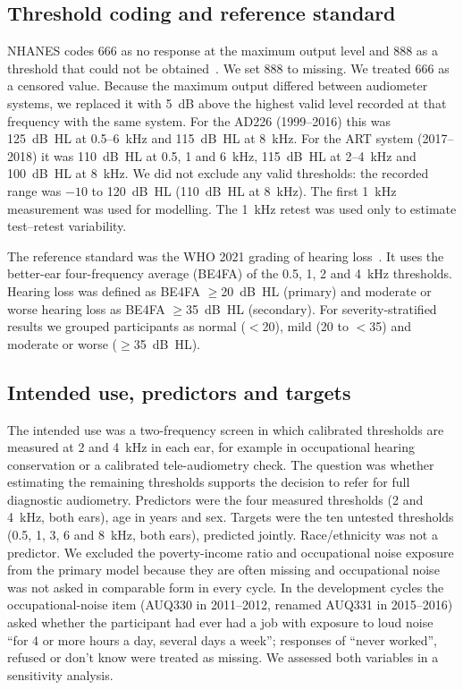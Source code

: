 \documentclass[11pt]{article}
\begin{document}
\subsection*{Threshold coding and reference standard}
NHANES codes 666 as no response at the maximum output level and 888 as a threshold that could not be obtained~\cite{nhanes_aux_g}. We set 888 to missing. We treated 666 as a censored value. Because the maximum output differed between audiometer systems, we replaced it with 5~dB above the highest valid level recorded at that frequency with the same system. For the AD226 (1999--2016) this was 125~dB~HL at 0.5--6~kHz and 115~dB~HL at 8~kHz. For the ART system (2017--2018) it was 110~dB~HL at 0.5, 1 and 6~kHz, 115~dB~HL at 2--4~kHz and 100~dB~HL at 8~kHz. We did not exclude any valid thresholds: the recorded range was $-10$ to 120~dB~HL (110~dB~HL at 8~kHz). The first 1~kHz measurement was used for modelling. The 1~kHz retest was used only to estimate test--retest variability.

The reference standard was the WHO 2021 grading of hearing loss~\cite{who2021,humes2019}. It uses the better-ear four-frequency average (BE4FA) of the 0.5, 1, 2 and 4~kHz thresholds. Hearing loss was defined as BE4FA $\geq$20~dB~HL (primary) and moderate or worse hearing loss as BE4FA $\geq$35~dB~HL (secondary). For severity-stratified results we grouped participants as normal ($<$20), mild (20 to $<$35) and moderate or worse ($\geq$35~dB~HL).

\subsection*{Intended use, predictors and targets}
The intended use was a two-frequency screen in which calibrated thresholds are measured at 2 and 4~kHz in each ear, for example in occupational hearing conservation or a calibrated tele-audiometry check. The question was whether estimating the remaining thresholds supports the decision to refer for full diagnostic audiometry. Predictors were the four measured thresholds (2 and 4~kHz, both ears), age in years and sex. Targets were the ten untested thresholds (0.5, 1, 3, 6 and 8~kHz, both ears), predicted jointly. Race/ethnicity was not a predictor. We excluded the poverty-income ratio and occupational noise exposure from the primary model because they are often missing and occupational noise was not asked in comparable form in every cycle. In the development cycles the occupational-noise item (AUQ330 in 2011--2012, renamed AUQ331 in 2015--2016) asked whether the participant had ever had a job with exposure to loud noise ``for 4 or more hours a day, several days a week''; responses of ``never worked'', refused or don't know were treated as missing. We assessed both variables in a sensitivity analysis.
\end{document}
